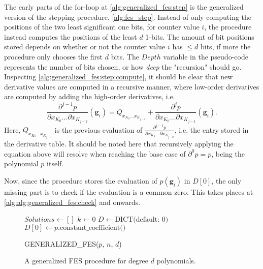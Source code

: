 The early parts of the for-loop at \cref{alg:generalized_fes:step} is the generalized version of the stepping procedure, \cref{alg:fes_step}. Instead of only computing the positions of the two least significant one bits, for counter value $i$, the procedure instead computes the positions of the least $d$ 1-bits. The amount of bit positions stored depends on whether or not the counter value $i$ has $\leq d$ bits, if more the procedure only chooses the first $d$ bits. The $Depth$ variable in the pseudo-code represents the number of bits chosen, or how \textit{deep} the "recursion" should go. Inspecting \cref{alg:generalized_fes:step:compute}, it should be clear that new derivative values are computed in a recursive manner, where low-order derivatives are computed by adding the high-order derivatives, i.e.
\begin{equation} \label{eq:fes_recurse}
    \frac{\partial^{j - 1} p}{\partial x_{K_0} \dots \partial x_{K_{j - 2}}}(\mathbf{g}_i) = Q_{x_{K_0} \dots x_{K_{j - 1}}} + \frac{\partial^j p}{\partial x_{K_0} \dots \partial x_{K_{j - 1}}}(\mathbf{g}_i).
\end{equation}
Here, $Q_{x_{K_0} \dots x_{K_{j - 1}}}$ is the previous evaluation of $\frac{\partial^{j - 1} p}{\partial x_{K_0} \dots \partial x_{K_{j - 2}}}$, i.e. the entry stored in the derivative table. It should be noted here that recursively applying the equation above will resolve when reaching the base case of $\partial^0 p = p$, being the polynomial $p$ itself.

Now, since the procedure stores the evaluation of $p(\mathbf{g}_i)$ in $D[0]$, the only missing part is to check if the evaluation is a common zero. This takes places at \cref{alg:alg:generalized_fes:check} and onwards.

\begin{figure}[ht]
    \begin{alg}
        $Solutions \gets []$\;
        $k \gets 0$\;
        $D \gets \text{DICT(default: 0)}$\;
        $D[0] \gets p.\text{constant\_coefficient()}$\;
        \ForEach{$i = 0, \dots 2^n - 1$}{ \label{alg:generalized_fes:step}
            $Depth \gets \min(\text{HAMMING\_WEIGHT}(i), d)$\;
            $K \gets \text{BITS}(i, Depth)$\;
            \ForEach{$j = Depth \dots, 1$}{
                $D[K_{0\dots j - 1}] \gets D[K_{0\dots j - 1}]] \oplus D[K_{0\dots j}]$\; \label{alg:generalized_fes:step:compute}
            }
            \If{$D[0] = 0$}{ \label{alg:alg:generalized_fes:check}
                $Solutions[k] \gets \text{GRAY}(i)$\;
                $k\pp$\;
            }
        }
        \caption{GENERALIZED\_FES($p$, $n$, $d$)} \label{alg:generalized_fes}
    \end{alg}
    \caption{A generalized FES procedure for degree $d$ polynomials.}
\end{figure}

